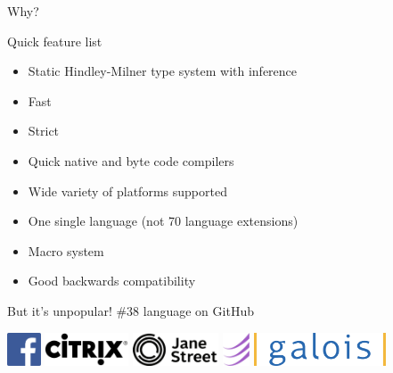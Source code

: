 \documentclass{beamer}
\begin{document}
\begin{frame}{}
  \center
  \fontsize{70}{70} \exclaim Why?
\end{frame}

\begin{frame}{Quick feature list}
  \begin{itemize}
    \item Static Hindley-Milner type system with inference
    \item Fast
    \item Strict
    \item Quick native and byte code compilers
    \item Wide variety of platforms supported
    \item One single language (not 70 language extensions)
    \item Macro system
    \item Good backwards compatibility
  \end{itemize}
\end{frame}

\begin{frame}{But it's unpopular!}
  \#38 language on GitHub

  \includegraphics[height=1cm]{facebook}
  \includegraphics[height=1cm]{citrix}
  \includegraphics[height=1cm]{janestreet}
  \includegraphics[height=1cm]{esper}
  \includegraphics[height=1cm]{galois}
\end{frame}
\end{document}
